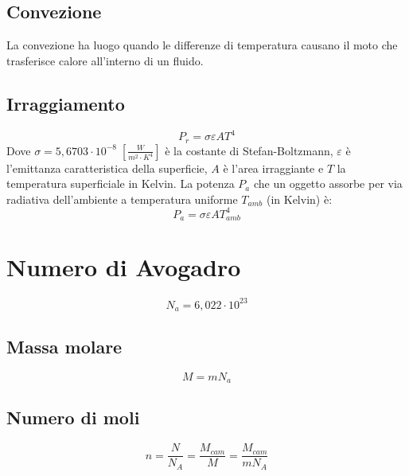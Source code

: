             \subsection*{Convezione} La convezione ha luogo quando le differenze
            di temperatura causano il moto che trasferisce calore all'interno 
            di un fluido.

            \subsection*{Irraggiamento}
                \begin{equation*}
                    P_r = \sigma \varepsilon AT^4
                \end{equation*}
            Dove $\sigma = 5,6703 \cdot 10^{-8} \; [\frac{W}{m^2 \cdot K^4}
            ]$ è la costante di Stefan-Boltzmann, $\varepsilon$ è l'emittanza
            caratteristica della superficie, $A$ è l'area irraggiante e $T$ la 
            temperatura superficiale in Kelvin. La potenza $P_a$ che un oggetto
            assorbe per via radiativa dell'ambiente a temperatura uniforme
            $T_{amb}$ (in Kelvin) è:
                \begin{equation*}
                    P_a = \sigma \varepsilon AT^4_{amb}
                \end{equation*}

    \section*{Numero di Avogadro}
        \begin{equation*}
            N_a = 6,022 \cdot 10^{23}
        \end{equation*}

        \subsection*{Massa molare}
            \begin{equation*}
                M = mN_a
            \end{equation*}
        
        \subsection*{Numero di moli}
            \begin{equation*}
                n = \frac{N}{N_A} = \frac{M_{cam}}{M} = \frac{M_{cam}}{mN_A}
            \end{equation*}

